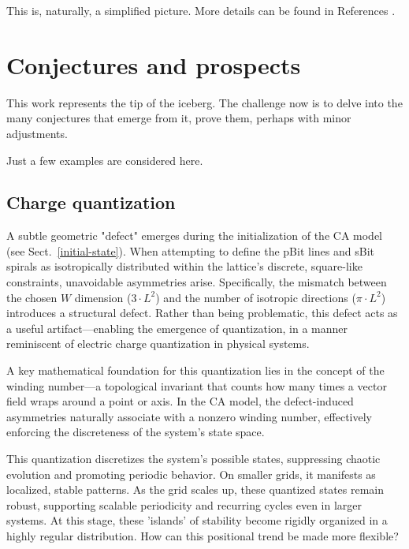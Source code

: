 \documentclass[12pt,english]{article}
\begin{document}
This is, naturally, a simplified picture. More details can be found in References \cite{thooft,Elze2019,rizzo2020perturbing}.


\section{Conjectures and prospects\label{sec:Prospects-and-conjectures}}

This work represents the tip of the iceberg. The challenge now is to delve into the many conjectures that emerge from it, prove them, perhaps with minor adjustments.

Just a few examples are considered here.

\subsection{Charge quantization} \label{subsec:charge-quantization}

A subtle geometric "defect" emerges during the initialization of the CA model (see Sect.~\ref{initial-state}). When attempting to define the pBit lines and sBit spirals as isotropically distributed within the lattice's discrete, square-like constraints, unavoidable asymmetries arise. Specifically, the mismatch between the chosen $W$ dimension ($3\cdot L^2$) and the number of isotropic directions ($\pi\cdot L^2$) introduces a structural defect. Rather than being problematic, this defect acts as a useful artifact—enabling the emergence of quantization, in a manner reminiscent of electric charge quantization in physical systems.

A key mathematical foundation for this quantization lies in the concept of the winding number—a topological invariant that counts how many times a vector field wraps around a point or axis. In the CA model, the defect-induced asymmetries naturally associate with a nonzero winding number, effectively enforcing the discreteness of the system’s state space.

This quantization discretizes the system's possible states, suppressing chaotic evolution and promoting periodic behavior. On smaller grids, it manifests as localized, stable patterns. As the grid scales up, these quantized states remain robust, supporting scalable periodicity and recurring cycles even in larger systems. At this stage, these 'islands' of stability become rigidly organized in a highly regular distribution. How can this positional trend be made more flexible?
\end{document}
